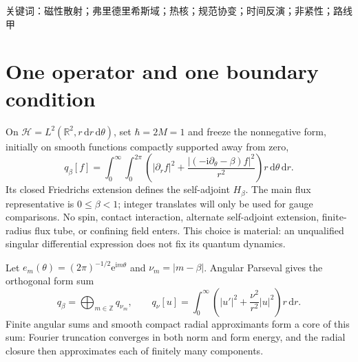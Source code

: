 \documentclass[10pt]{article}
\newcommand{\dd}{\,\mathrm d}
\newcommand{\e}{\mathrm e}
\newcommand{\ii}{\mathrm i}
\newcommand{\HH}{\mathcal H}
\begin{document}
{\cjkfont\noindent 关键词：磁性散射；弗里德里希斯域；热核；规范协变；时间反演；非紧性；路线甲}
\fi

\section{One operator and one boundary condition}
On $\HH=L^2(\mathbb R^2,r\dd r\dd\theta)$, set $\hbar=2M=1$ and
freeze the nonnegative form, initially on smooth functions compactly supported
away from zero,
\begin{equation}
q_\beta[f]=\int_0^\infty\int_0^{2\pi}
\left(|\partial_rf|^2+\frac{|(-\ii\partial_\theta-\beta)f|^2}{r^2}\right)
r\dd\theta\dd r.\label{eq:form}
\end{equation}
Its closed Friedrichs extension defines the self-adjoint $H_\beta$.
The main flux representative is $0\le\beta<1$; integer translates will only
be used for gauge comparisons. No spin, contact interaction, alternate
self-adjoint extension, finite-radius flux tube, or confining field enters.
This choice is material: an unqualified singular differential expression does
not fix its quantum dynamics.

Let $e_m(\theta)=(2\pi)^{-1/2}\e^{\ii m\theta}$ and $\nu_m=|m-\beta|$.
Angular Parseval gives the orthogonal form sum
\begin{equation}
q_\beta=\bigoplus_{m\in\mathbb Z}q_{\nu_m},\qquad
q_\nu[u]=\int_0^\infty\left(|u'|^2+\frac{\nu^2}{r^2}|u|^2\right)r\dd r.
\label{eq:radialform}
\end{equation}
Finite angular sums and smooth compact radial approximants form a core of
this sum: Fourier truncation converges in both norm and form energy, and the
radial closure then approximates each of finitely many components.
\end{document}
